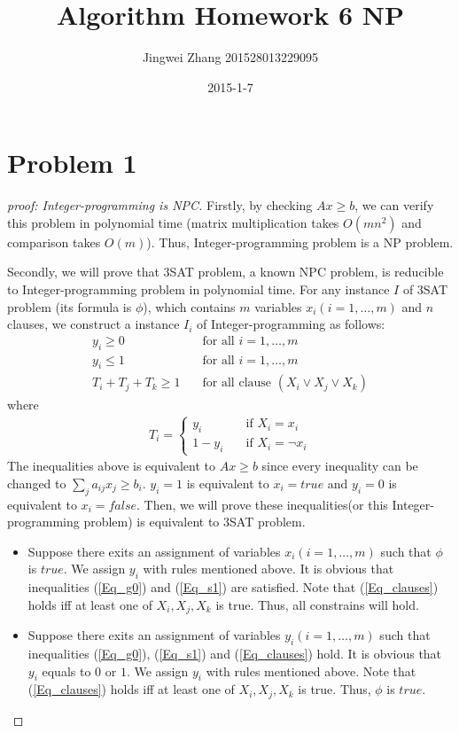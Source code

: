 \documentclass[]{article}
\title{Algorithm Homework 6 NP}
\date{2015-1-7}
\author{Jingwei Zhang 201528013229095}
\begin{document}
    \maketitle
    \section{Problem 1}
        \begin{proof}[proof: Integer-programming is NPC]
        \item Firstly, by checking $Ax \geq b$, we can verify this problem in polynomial time (matrix multiplication takes $O(mn^2)$ and comparison takes $O(m)$). Thus, Integer-programming problem is a NP problem.
        \item Secondly, we will prove that 3SAT problem, a known NPC problem, is reducible to Integer-programming problem in polynomial time. For any instance $I$ of 3SAT problem (its formula is $\phi$), which contains $m$ variables $x_i(i = 1,\dots,m)$ and $n$ clauses, we construct a instance $I_i$ of Integer-programming as follows: 
        \begin{align}
        y_i \geq 0 \quad & \text{for all }i = 1,\dots,m \label{Eq_g0} \\
        y_i \leq 1 \quad & \text{for all }i = 1,\dots,m \label{Eq_s1}\\
        T_i + T_j + T_k \geq 1 \quad & \text{for all clause } (X_i \vee X_j \vee X_k) \label{Eq_clauses}
        \end{align}
        where 
        \begin{align}
        T_i = \begin{cases}
                y_i \quad & \text{if } X_i = x_i \\
                1 - y_i\quad & \text{if } X_i = \neg x_i 
              \end{cases} 
        \end{align}
        The inequalities above is equivalent to $Ax \geq b$ since every inequality can be changed to $\sum_j a_{ij} x_j \geq b_i$. $y_i=1$ is equivalent to $x_i=true$ and $y_i=0$ is equivalent to $x_i= false$. Then, we will prove these inequalities(or this Integer-programming problem) is equivalent to 3SAT problem.
        \begin{itemize}
        \item Suppose there exits an assignment of variables $x_i(i = 1,\dots,m)$ such that $\phi$ is $true$. We assign $y_i$ with rules mentioned above. It is obvious that inequalities (\ref{Eq_g0}) and (\ref{Eq_s1}) are satisfied. Note that (\ref{Eq_clauses}) holds iff at least one of $X_i, X_j, X_k$ is true. Thus, all constrains will hold.
        \item Suppose there exits an assignment of variables $y_i(i = 1,\dots,m)$ such that inequalities (\ref{Eq_g0}), (\ref{Eq_s1}) and (\ref{Eq_clauses}) hold. It is obvious that $y_i$ equals to $0$ or $1$. We assign $y_i$ with rules mentioned above. Note that (\ref{Eq_clauses}) holds iff at least one of $X_i, X_j, X_k$ is true. Thus, $\phi$ is $true$.
        

\end{itemize}
\end{proof}
\end{document}
